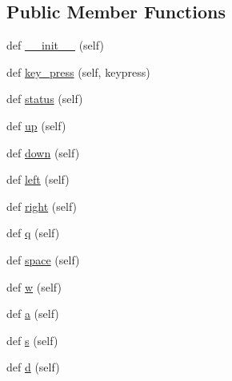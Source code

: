 \subsection*{Public Member Functions}
\begin{DoxyCompactItemize}
\item 
def \mbox{\hyperlink{classbridges_1_1input__helper_1_1_input_helper_a1e5078f3c252de554409d3fdb49fcaaa}{\+\_\+\+\_\+init\+\_\+\+\_\+}} (self)
\item 
def \mbox{\hyperlink{classbridges_1_1input__helper_1_1_input_helper_ac1501918e03c17ae99e8d04d7576c58e}{key\+\_\+press}} (self, keypress)
\item 
def \mbox{\hyperlink{classbridges_1_1input__helper_1_1_input_helper_a49594a94ff16c661fc275191ff9217c9}{status}} (self)
\item 
def \mbox{\hyperlink{classbridges_1_1input__helper_1_1_input_helper_a26a435f11a7c2c202129ad9d86a36283}{up}} (self)
\item 
def \mbox{\hyperlink{classbridges_1_1input__helper_1_1_input_helper_a609f52d4b50d69a7b75c2bf125262413}{down}} (self)
\item 
def \mbox{\hyperlink{classbridges_1_1input__helper_1_1_input_helper_aea173110055fcc3470ac4b61c1608194}{left}} (self)
\item 
def \mbox{\hyperlink{classbridges_1_1input__helper_1_1_input_helper_a87226e5ae46e8c79dfcf87f7493b835a}{right}} (self)
\item 
def \mbox{\hyperlink{classbridges_1_1input__helper_1_1_input_helper_a85de78fab5f34c3969af7c1bc0c1e97b}{q}} (self)
\item 
def \mbox{\hyperlink{classbridges_1_1input__helper_1_1_input_helper_a765e389cd5becacf3880debf4678715b}{space}} (self)
\item 
def \mbox{\hyperlink{classbridges_1_1input__helper_1_1_input_helper_a7f8ea223e81a31d094ea16cc7d4ce1e3}{w}} (self)
\item 
def \mbox{\hyperlink{classbridges_1_1input__helper_1_1_input_helper_ab46a28fb36f78208840e1bc49f523d71}{a}} (self)
\item 
def \mbox{\hyperlink{classbridges_1_1input__helper_1_1_input_helper_a2b08296f9bfe269c481bca1e7a030a53}{s}} (self)
\item 
def \mbox{\hyperlink{classbridges_1_1input__helper_1_1_input_helper_a1eade5f8acf2f1c85671c90cdfcaf57e}{d}} (self)
\end{DoxyCompactItemize}
